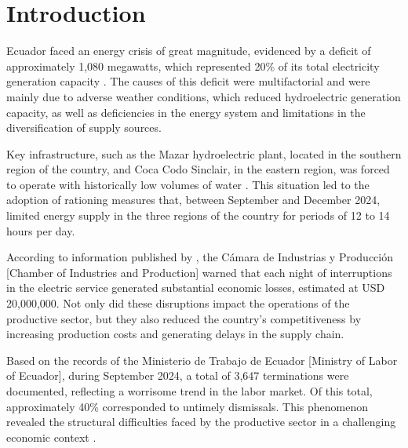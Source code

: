\documentclass[english]{textolivre}
\begin{document}
\begin{polyabstract}
\begin{portuguese}
\begin{abstract}
\end{abstract}
\end{portuguese}
\end{polyabstract}

\section{Introduction}

Ecuador faced an energy crisis of great magnitude, evidenced by a deficit of approximately 1,080 megawatts, which represented 20\% of its total electricity generation capacity \cite{moncada2024apagones}. The causes of this deficit were multifactorial and were mainly due to adverse weather conditions, which reduced hydroelectric generation capacity, as well as deficiencies in the energy system and limitations in the diversification of supply sources.

Key infrastructure, such as the Mazar hydroelectric plant, located in the southern region of the country, and Coca Codo Sinclair, in the eastern region, was forced to operate with historically low volumes of water \cite{molina2024racionamientos}. This situation led to the adoption of rationing measures that, between September and December 2024, limited energy supply in the three regions of the country for periods of 12 to 14 hours per day.

According to information published by \textcite{forbesstaff2024apagones}, the Cámara de Industrias y Producción [Chamber of Industries and Production] warned that each night of interruptions in the electric service generated substantial economic losses, estimated at USD 20,000,000. Not only did these disruptions impact the operations of the productive sector, but they also reduced the country’s competitiveness by increasing production costs and generating delays in the supply chain.

Based on the records of the Ministerio de Trabajo de Ecuador [Ministry of Labor of Ecuador], during September 2024, a total of 3,647 terminations were documented, reflecting a worrisome trend in the labor market. Of this total, approximately 40\% corresponded to untimely dismissals. This phenomenon revealed the structural difficulties faced by the productive sector in a challenging economic context \cite{mella2024oscuras}.
\end{document}
